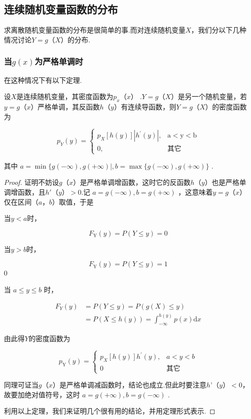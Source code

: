 \subsection{连续随机变量函数的分布}

求离散随机变量函数的分布是很简单的事.而对连续随机变量$ X $，我们分以下几种情况讨论$ Y=g（X） $的分布.

\subsubsection{当$ g(x) $为严格单调时}

在这种情况下有以下定理.

\begin{theorem}{}{}
	设$ X $是连续随机变量，其密度函数为$ p_{x}（x） $ .$ Y=g（X） $是另一个随机变量，若$ y=g（x） $严格单调，其反函数$ h（y） $有连续导函数，则$ Y=g（X） $的密度函数为
	
	\begin{equation}
	p_{Y}(y)=\left\{
	\begin{array}{ll}
	{p_{X}[h(y)]\left|h^{\prime}(y)\right|,} & { \mathrm{a}<\mathrm{y}<\mathrm{b}} \\ 
	{0,} & {\text{其它}}
	\end{array}\right. \label{eq:2.6.1}
	\end{equation}
	
	其中 $a=\min \{g(-\infty), g(+\infty) |, b=\max \{g(-\infty), g(+\infty)\}$ .
\end{theorem}

\begin{proof}
	证明不妨设$ g（x） $是严格单调增函数，这时它的反函数$ h（y） $也是严格单调增函数，且$ h'（y）>0 $.记 $a=g(-\infty), b=g(+\infty)$ ，这意味着$ y=g（x） $仅在区间$ （a，b） $取值，于是
	
	当$ y<a $时，
	
	\[
	F_{\mathrm{Y}}(y)=P(Y \leqslant y)=0
	\]
	
	当$ y>b $时，
	
	\[
	F_{\mathrm{Y}}(y)=P(Y \leqslant y)=1
	\]0
	
	当 $a \leqslant y \leqslant b$ 时，
	
	\[
	\begin{aligned} F_{Y}(y) &=P(Y \leqslant y)=P(g(X) \leqslant y) \\ &=P(X \leqslant h(y))=\int_{-\infty}^{h(y)} p(x) \mathrm{d} x \end{aligned}
	\]
	
	由此得$ Y $的密度函数为
	
	\[
	p_{\mathrm{Y}}(y)=\left\{
	\begin{array}{ll}
	{p_{X}[h(y)] h^{\prime}(y), } & {a<y<b} \\ 
	{0} & {\text{其它}}
	\end{array}\right.
	\]
	
	同理可证当$ g（x） $是严格单调减函数时，结论也成立.但此时要注意$ h’（y）<0 $，故要加绝对值符号，这时 $a=g(+\infty), b=g(-\infty)$ .
	
	利用以上定理，我们来证明几个很有用的结论，并用定理形式表示.
\end{proof}

